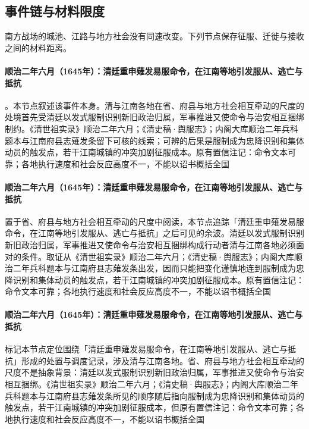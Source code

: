 

\subsection{事件链与材料限度}
南方战场的城池、江路与地方社会没有同速改变。下列节点保存征服、迁徙与接收之间的材料距离。

\paragraph{顺治二年六月（1645年）：清廷重申薙发易服命令，在江南等地引发服从、逃亡与抵抗}
。本节点叙述该事件本身。清与江南各地在省、府县与地方社会相互牵动的尺度的处境首先受清廷以发式服制识别新旧政治归属，军事推进又使命令与治安相互捆绑制约。《清世祖实录》顺治二年六月；《清史稿·舆服志》；内阁大库顺治二年兵科题本与江南府县志薙发条留下可核的线索；可辨的后果是服制成为忠降识别和集体动员的触发点，若干江南城镇的冲突加剧征服成本。原有置信注记：命令文本可靠；各地执行速度和社会反应高度不一，不能以诏书概括全国

\paragraph{顺治二年六月（1645年）：清廷重申薙发易服命令，在江南等地引发服从、逃亡与抵抗}
 置于省、府县与地方社会相互牵动的尺度中阅读，本节点追踪「清廷重申薙发易服命令，在江南等地引发服从、逃亡与抵抗」之后可见的余波。清廷以发式服制识别新旧政治归属，军事推进又使命令与治安相互捆绑构成行动者清与江南各地必须面对的条件。取证从《清世祖实录》顺治二年六月；《清史稿·舆服志》；内阁大库顺治二年兵科题本与江南府县志薙发条出发，因而只能把变化谨慎地连到服制成为忠降识别和集体动员的触发点，若干江南城镇的冲突加剧征服成本。原有置信注记：命令文本可靠；各地执行速度和社会反应高度不一，不能以诏书概括全国

\paragraph{顺治二年六月（1645年）：清廷重申薙发易服命令，在江南等地引发服从、逃亡与抵抗}
 标记本节点定位围绕「清廷重申薙发易服命令，在江南等地引发服从、逃亡与抵抗」形成的处置与调度记录，涉及清与江南各地。省、府县与地方社会相互牵动的尺度不是抽象背景：清廷以发式服制识别新旧政治归属，军事推进又使命令与治安相互捆绑。《清世祖实录》顺治二年六月；《清史稿·舆服志》；内阁大库顺治二年兵科题本与江南府县志薙发条所见的顺序随后指向服制成为忠降识别和集体动员的触发点，若干江南城镇的冲突加剧征服成本，但原有置信注记：命令文本可靠；各地执行速度和社会反应高度不一，不能以诏书概括全国

